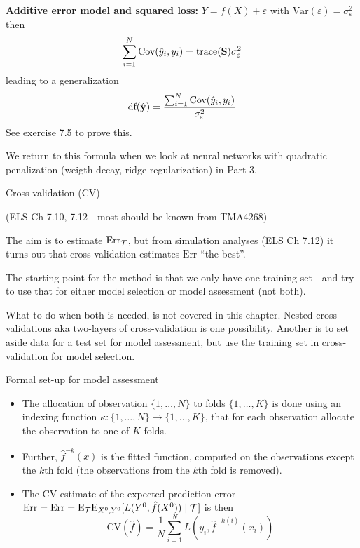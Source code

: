 \documentclass[
  ignorenonframetext,
]{beamer}
\begin{document}
\begin{frame}

\textbf{Additive error model and squared loss:} \(Y=f(X)+\varepsilon\)
with \(\text{Var}(\varepsilon)=\sigma_{\varepsilon}^2\) then
\[ \sum_{i=1}^N \text{Cov}(\hat{y}_i,y_i)=\text{trace}({\bf S})\sigma_{\varepsilon}^2\]
leading to a generalization
\[\text{df}(\hat{{\bf y}})=\frac{\sum_{i=1}^N \text{Cov}(\hat{y}_i,y_i)}{\sigma_{\varepsilon}^2}\]
See exercise 7.5 to prove this.

We return to this formula when we look at neural networks with quadratic
penalization (weigth decay, ridge regularization) in Part 3.

\end{frame}

\begin{frame}

\begin{block}{Cross-validation (CV)}

(ELS Ch 7.10, 7.12 - most should be known from TMA4268)

The aim is to estimate \(\text{Err}_{\cal T}\), but from simulation
analyses (ELS Ch 7.12) it turns out that cross-validation estimates
\(\text{Err}\) ``the best''.

The starting point for the method is that we only have one training set
- and try to use that for either model selection or model assessment
(not both).

What to do when both is needed, is not covered in this chapter. Nested
cross-validations aka two-layers of cross-validation is one possibility.
Another is to set aside data for a test set for model assessment, but
use the training set in cross-validation for model selection.

\end{block}

\end{frame}

\begin{frame}

\begin{block}{Formal set-up for model assessment}

\begin{itemize}
\item
  The allocation of observation \(\{1,\ldots,N\}\) to folds
  \(\{1,\ldots,K\}\) is done using an indexing function
  \(\kappa: \{1,\ldots,N\} \rightarrow \{1,\ldots,K\}\), that for each
  observation allocate the observation to one of \(K\) folds.
\item
  Further, \(\hat{f}^{-k}(x)\) is the fitted function, computed on the
  observations except the \(k\)th fold (the observations from the
  \(k\)th fold is removed).
\item
  The CV estimate of the expected prediction error
  \(\text{Err}=\text{Err}=\text{E}_{\cal T} \text{E}_{X^0,Y^0}[L(Y^0,\hat{f}(X^0))\mid {\cal T}]\)
  is then
  \[ \text{CV}(\hat{f})=\frac{1}{N}\sum_{i=1}^N L(y_i,\hat{f}^{-k(i)}(x_i))\]
\end{itemize}

\end{block}

\end{frame}
\end{document}
